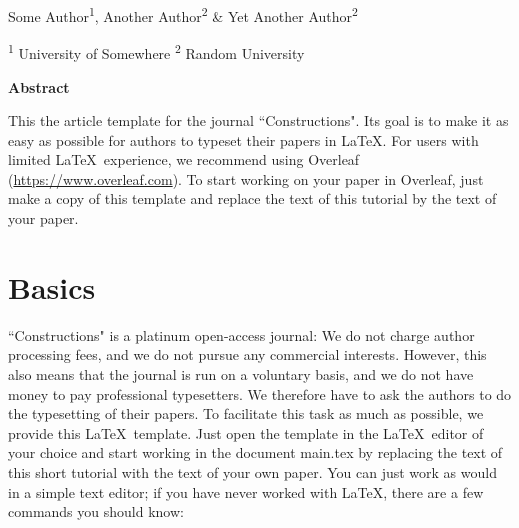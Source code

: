 \vspace{30pt}
\begin{center}
    \LARGE{}
\end{center}

\begin{center}
\vspace{4pt}
\large
    Some Author\textsuperscript{1}, Another Author\textsuperscript{2} \& Yet Another Author\textsuperscript{2}
    
\small
   \textsuperscript{1} University of Somewhere \textsuperscript{2} Random University 

\end{center}



\begin{small}
\begin{center}
\vspace{9pt}
\textbf{Abstract}    
\end{center}

\begin{adjustwidth}{20pt}{20pt}
\small \noindent This the article template for the journal ``Constructions". Its goal is to make it as easy as possible for authors to typeset their papers in \LaTeX. For users with limited \LaTeX \  experience, we recommend using Overleaf (\url{https://www.overleaf.com}). To start working on your paper in Overleaf, just make a copy of this template and replace the text of this tutorial by the text of your paper.
\end{adjustwidth}


\end{small}




\vspace{10pt}
\section{Basics}\label{Sec:Introduction}
``Constructions" is a platinum open-access journal: We do not charge author processing fees, and we do not pursue any commercial interests. However, this also means that the journal is run on a voluntary basis, and we do not have money to pay professional typesetters. We therefore have to ask the authors to do the typesetting of their papers. To facilitate this task as much as possible, we provide this \LaTeX \ template. Just open the template in the \LaTeX \  editor of your choice and start working in the document main.tex by replacing the text of this short tutorial with the text of your own paper. You can just work as would in a simple text editor; if you have never worked with \LaTeX, there are a few commands you should know:

